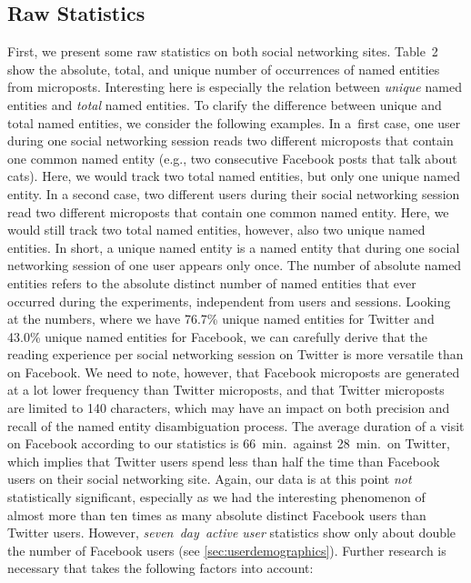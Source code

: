 \documentclass{iosart2c}
\begin{document}
\subsection{Raw Statistics}
First, we present some raw statistics on both social networking sites.
Table~2 show the absolute, total, and unique number of occurrences of named entities from microposts.
Interesting here is especially the relation between \emph{unique} named entities and \emph{total} named entities.
To clarify the difference between unique and total named entities, we consider the following examples.
In a~first case, one user during one social networking session reads two different microposts that contain one common named entity (e.g., two consecutive Facebook posts that talk about cats).
Here, we would track two total named entities, but only one unique named entity.
In a second case, two different users during their social networking session read two different microposts that contain one common named entity. Here, we would still track two total named entities, however, also two unique named entities.
In short, a unique named entity is a named entity that during one social networking session of one user appears only once.
The number of absolute named entities refers to the absolute distinct number of named entities that ever occurred during the experiments, independent from users and sessions.
Looking at the numbers, where we have 76.7\% unique named entities for Twitter and 43.0\% unique named entities for Facebook, we can carefully derive that the reading experience per social networking session on Twitter is more versatile than on Facebook.
We need to note, however, that Facebook microposts are generated at a lot lower frequency than Twitter microposts, and that Twitter microposts are limited to 140 characters, which may have an impact on both precision and recall of the named entity disambiguation process.
The average duration of a visit on Facebook according to our statistics is 66~min.\ against 28~min.\ on Twitter, which implies that Twitter users spend less than half the time than Facebook users on their social networking site.
Again, our data is at this point \emph{not} statistically significant, especially as we had the interesting phenomenon of almost more than ten times as many absolute distinct Facebook users than Twitter users.
However, \emph{seven~day~active user} statistics show only about double the number of Facebook users (see \autoref{sec:userdemographics}).
Further research is necessary that takes the following factors into account:
\end{document}
